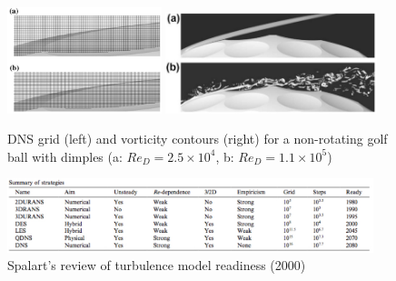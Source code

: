 \documentclass[journal]{new-aiaa}
\begin{document}
\begin{figure}[H]
\begin{center}
\includegraphics[width=0.40\textwidth]{Images/logan/smith2010numerical_golfballgrid.pdf}
\includegraphics[width=0.55\textwidth]{Images/logan/smith2010numerical_golfballvorticity.pdf}
\caption{ DNS grid (left) and vorticity contours (right) for a non-rotating golf ball with dimples (a: $Re_D = 2.5\times10^4$, b: $Re_D=1.1\times10^5$) \cite{smith2010numerical} }
\label{fig:dnsgolfball}
\end{center}
\end{figure}












\begin{figure}[H]
\begin{center}
\includegraphics[width=0.95\textwidth]{Images/logan/spalart2000strategies_TurbModelTable.pdf}
\caption{ Spalart's review of turbulence model readiness (2000) \cite{spalart2000strategies} }
\label{fig:turbulencemodelreadiness}
\end{center}
\end{figure}
\end{document}
